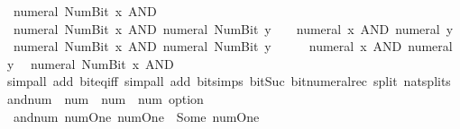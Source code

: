 \begin{isabellebody}
\ \ {\isacartoucheopen}numeral\ {\isacharparenleft}{\kern0pt}Num{\isachardot}{\kern0pt}Bit{}\ x{\isacharparenright}{\kern0pt}\ AND\ {}\ {\isacharequal}{\kern0pt}\ {}{\isacartoucheclose}\isanewline
\ \ {\isacartoucheopen}numeral\ {\isacharparenleft}{\kern0pt}Num{\isachardot}{\kern0pt}Bit{}\ x{\isacharparenright}{\kern0pt}\ AND\ numeral\ {\isacharparenleft}{\kern0pt}Num{\isachardot}{\kern0pt}Bit{}\ y{\isacharparenright}{\kern0pt}\ {\isacharequal}{\kern0pt}\ {}\ {\isacharasterisk}{\kern0pt}\ {\isacharparenleft}{\kern0pt}numeral\ x\ AND\ numeral\ y{\isacharparenright}{\kern0pt}{\isacartoucheclose}\isanewline
\ \ {\isacartoucheopen}numeral\ {\isacharparenleft}{\kern0pt}Num{\isachardot}{\kern0pt}Bit{}\ x{\isacharparenright}{\kern0pt}\ AND\ numeral\ {\isacharparenleft}{\kern0pt}Num{\isachardot}{\kern0pt}Bit{}\ y{\isacharparenright}{\kern0pt}\ {\isacharequal}{\kern0pt}\ {}\ {\isacharplus}{\kern0pt}\ {}\ {\isacharasterisk}{\kern0pt}\ {\isacharparenleft}{\kern0pt}numeral\ x\ AND\ numeral\ y{\isacharparenright}{\kern0pt}{\isacartoucheclose}\isanewline
\ \ {\isacartoucheopen}numeral\ {\isacharparenleft}{\kern0pt}Num{\isachardot}{\kern0pt}Bit{}\ x{\isacharparenright}{\kern0pt}\ AND\ {}\ {\isacharequal}{\kern0pt}\ {}{\isacartoucheclose}\isanewline
%
\isadelimproof
\ \ %
\endisadelimproof
%
\isatagproof
{}\isamarkupfalse%
\ {\isacharparenleft}{\kern0pt}simp{\isacharunderscore}{\kern0pt}all\ add{\isacharcolon}{\kern0pt}\ bit{\isacharunderscore}{\kern0pt}eq{\isacharunderscore}{\kern0pt}iff{\isacharparenright}{\kern0pt}\ {\isacharparenleft}{\kern0pt}simp{\isacharunderscore}{\kern0pt}all\ add{\isacharcolon}{\kern0pt}\ bit{\isacharunderscore}{\kern0pt}simps\ bit{\isacharunderscore}{\kern0pt}Suc\ bit{\isacharunderscore}{\kern0pt}numeral{\isacharunderscore}{\kern0pt}rec\ split{\isacharcolon}{\kern0pt}\ nat{\isachardot}{\kern0pt}splits{\isacharparenright}{\kern0pt}%
\endisatagproof
{\isafoldproof}%
%
\isadelimproof
\isanewline
%
\endisadelimproof
\isanewline
{}\isamarkupfalse%
\ and{\isacharunderscore}{\kern0pt}num\ {\isacharcolon}{\kern0pt}{\isacharcolon}{\kern0pt}\ {\isacartoucheopen}num\ {\isasymRightarrow}\ num\ {\isasymRightarrow}\ num\ option{\isacartoucheclose}\ \isanewline
{}\isanewline
\ \ {\isacartoucheopen}and{\isacharunderscore}{\kern0pt}num\ num{\isachardot}{\kern0pt}One\ num{\isachardot}{\kern0pt}One\ {\isacharequal}{\kern0pt}\ Some\ num{\isachardot}{\kern0pt}One{\isacartoucheclose}\isanewline

\end{isabellebody}
